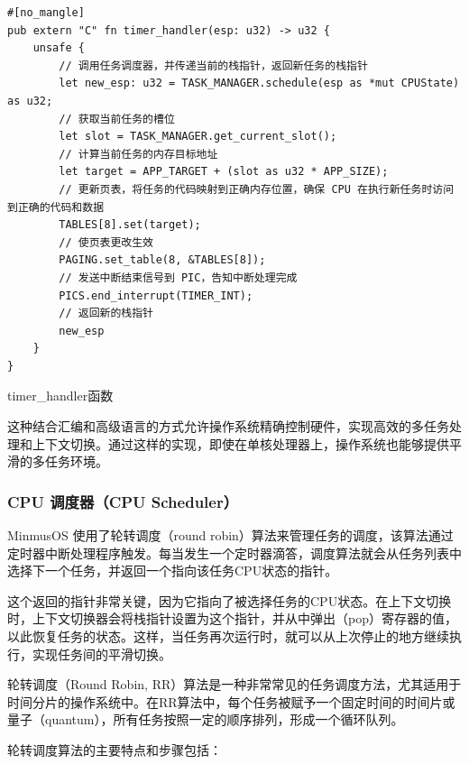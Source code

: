 \begin{listing}[htbp]
    \begin{verbatim}
#[no_mangle]
pub extern "C" fn timer_handler(esp: u32) -> u32 {
    unsafe {
        // 调用任务调度器，并传递当前的栈指针，返回新任务的栈指针
        let new_esp: u32 = TASK_MANAGER.schedule(esp as *mut CPUState) as u32;
        // 获取当前任务的槽位
        let slot = TASK_MANAGER.get_current_slot();
        // 计算当前任务的内存目标地址
        let target = APP_TARGET + (slot as u32 * APP_SIZE);
        // 更新页表，将任务的代码映射到正确内存位置，确保 CPU 在执行新任务时访问到正确的代码和数据
        TABLES[8].set(target);
        // 使页表更改生效
        PAGING.set_table(8, &TABLES[8]);
        // 发送中断结束信号到 PIC，告知中断处理完成
        PICS.end_interrupt(TIMER_INT);
        // 返回新的栈指针
        new_esp
    }
}
    \end{verbatim}
    \caption{timer\_handler函数}\label{lst:TimerHandlerFunction}
\end{listing}

这种结合汇编和高级语言的方式允许操作系统精确控制硬件，实现高效的多任务处理和上下文切换。通过这样的实现，即使在单核处理器上，操作系统也能够提供平滑的多任务环境。

\subsubsection{CPU 调度器（CPU Scheduler）}\label{sec:CPUScheduler}

MinmusOS 使用了轮转调度（round robin）算法来管理任务的调度，该算法通过定时器中断处理程序触发。每当发生一个定时器滴答，调度算法就会从任务列表中选择下一个任务，并返回一个指向该任务CPU状态的指针。

这个返回的指针非常关键，因为它指向了被选择任务的CPU状态。在上下文切换时，上下文切换器会将栈指针设置为这个指针，并从中弹出（pop）寄存器的值，以此恢复任务的状态。这样，当任务再次运行时，就可以从上次停止的地方继续执行，实现任务间的平滑切换。

轮转调度（Round Robin, RR）算法是一种非常常见的任务调度方法，尤其适用于时间分片的操作系统中。在RR算法中，每个任务被赋予一个固定时间的时间片或量子（quantum），所有任务按照一定的顺序排列，形成一个循环队列。

轮转调度算法的主要特点和步骤包括：

